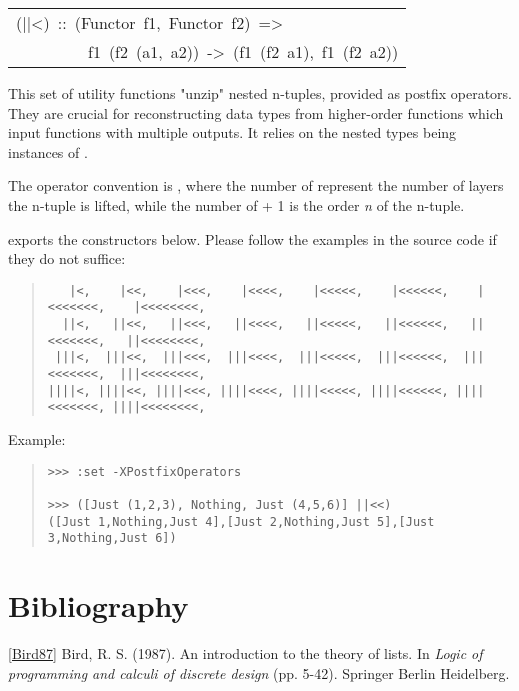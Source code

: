 \begin{haddockdesc}
\item[\begin{tabular}{@{}l}
(||<)\ ::\ (Functor\ f1,\ Functor\ f2)\ =>\\\ \ \ \ \ \ \ \ \ f1\ (f2\ (a1,\ a2))\ ->\ (f1\ (f2\ a1),\ f1\ (f2\ a2))
\end{tabular}]\haddockbegindoc
This set of utility functions "unzip" nested n-tuples, provided
 as postfix operators. They are crucial for reconstructing data
 types from higher-order functions which input functions with
 multiple outputs. It relies on the nested types being instances of
 .\par
The operator convention is \haddocktt{(|+<+)}, where the number of \haddocktt{|}
 represent the number of layers the n-tuple is lifted, while the
 number of \haddocktt{<} + 1 is the order \emph{n} of the n-tuple.\par
{} exports the constructors below. Please
 follow the examples in the source code if they do not suffice:\par
\begin{quote}
{\haddockverb\begin{verbatim}
   |<,    |<<,    |<<<,    |<<<<,    |<<<<<,    |<<<<<<,    |<<<<<<<,    |<<<<<<<<,
  ||<,   ||<<,   ||<<<,   ||<<<<,   ||<<<<<,   ||<<<<<<,   ||<<<<<<<,   ||<<<<<<<<,
 |||<,  |||<<,  |||<<<,  |||<<<<,  |||<<<<<,  |||<<<<<<,  |||<<<<<<<,  |||<<<<<<<<,  
||||<, ||||<<, ||||<<<, ||||<<<<, ||||<<<<<, ||||<<<<<<, ||||<<<<<<<, ||||<<<<<<<<, \end{verbatim}}
\end{quote}
Example:\par
\begin{quote}
{\haddockverb\begin{verbatim}
>>> :set -XPostfixOperators

>>> ([Just (1,2,3), Nothing, Just (4,5,6)] ||<<)
([Just 1,Nothing,Just 4],[Just 2,Nothing,Just 5],[Just 3,Nothing,Just 6])

\end{verbatim}}
\end{quote}
\end{haddockdesc}
\section{Bibliography}
 \href{https://www.cs.ox.ac.uk/files/3378/PRG56.pdf}{[Bird87]} Bird, R. S. (1987). An introduction to the theory of lists. In \emph{Logic of programming and calculi of discrete design} (pp. 5-42). Springer Berlin Heidelberg.\par

